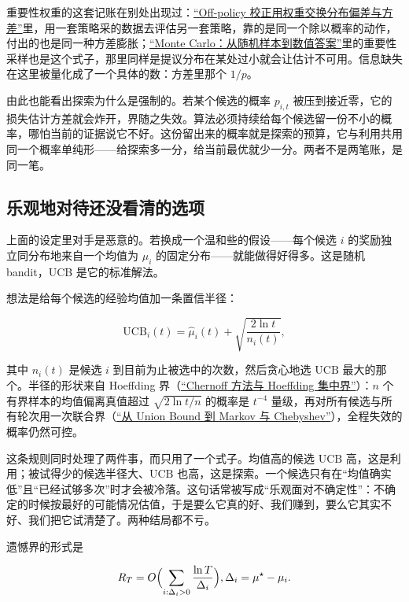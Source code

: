重要性权重的这套记账在别处出现过：\hyperref[sec:16-Control-and-Reinforcement-Learning/02-Reinforcement-Learning/08]{``Off-policy 校正用权重交换分布偏差与方差''}里，用一套策略采的数据去评估另一套策略，靠的是同一个除以概率的动作，付出的也是同一种方差膨胀；\hyperref[sec:05-Probability/08-Limit-Theorems/05]{``Monte Carlo：从随机样本到数值答案''}里的重要性采样也是这个式子，那里同样是提议分布在某处过小就会让估计不可用。信息缺失在这里被量化成了一个具体的数：方差里那个 \(1/p\)。

由此也能看出探索为什么是强制的。若某个候选的概率 \(p_{i,t}\) 被压到接近零，它的损失估计方差就会炸开，界随之失效。算法必须持续给每个候选留一份不小的概率，哪怕当前的证据说它不好。这份留出来的概率就是探索的预算，它与利用共用同一个概率单纯形——给探索多一分，给当前最优就少一分。两者不是两笔账，是同一笔。

\subsection{乐观地对待还没看清的选项}

上面的设定里对手是恶意的。若换成一个温和些的假设——每个候选 \(i\) 的奖励独立同分布地来自一个均值为 \(\mu_i\) 的固定分布——就能做得好得多。这是随机 bandit，UCB 是它的标准解法。

想法是给每个候选的经验均值加一条置信半径：

\[
\mathrm{UCB}_i(t)=\hat\mu_i(t)+\sqrt{\frac{2\ln t}{n_i(t)}},
\]

其中 \(n_i(t)\) 是候选 \(i\) 到目前为止被选中的次数，然后贪心地选 \(\mathrm{UCB}\) 最大的那个。半径的形状来自 Hoeffding 界（\hyperref[sec:05-Probability/07-Transforms-and-Bounds/04]{``Chernoff 方法与 Hoeffding 集中界''}）：\(n\) 个有界样本的均值偏离真值超过 \(\sqrt{2\ln t/n}\) 的概率是 \(t^{-4}\) 量级，再对所有候选与所有轮次用一次联合界（\hyperref[sec:05-Probability/07-Transforms-and-Bounds/02]{``从 Union Bound 到 Markov 与 Chebyshev''}），全程失效的概率仍然可控。

这条规则同时处理了两件事，而只用了一个式子。均值高的候选 \(\mathrm{UCB}\) 高，这是利用；被试得少的候选半径大、\(\mathrm{UCB}\) 也高，这是探索。一个候选只有在``均值确实低''且``已经试够多次''时才会被冷落。这句话常被写成``乐观面对不确定性''：不确定的时候按最好的可能情况估值，于是要么它真的好、我们赚到，要么它其实不好、我们把它试清楚了。两种结局都不亏。

遗憾界的形式是

\[
R_T=O\Bigl(\sum_{i:\Delta_i>0}\frac{\ln T}{\Delta_i}\Bigr),
\qquad \Delta_i=\mu^\star-\mu_i .
\]

